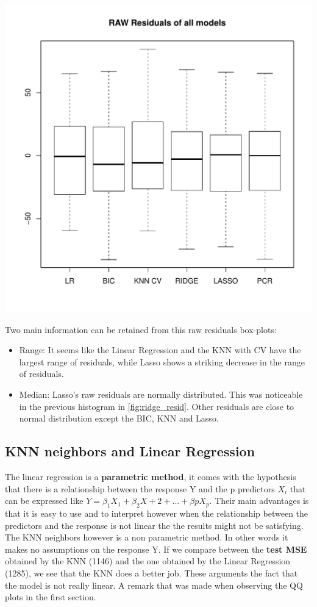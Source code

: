 \documentclass[]{report}
\begin{document}
\begin{center}
	\includegraphics[width=0.8\linewidth]{Figures/all_resid.pdf}
\end{center}
Two main information can be retained from this raw residuals box-plots: 
\begin{itemize}
\item Range: It seems like the Linear Regression and the KNN with CV have the largest range of residuals, while Lasso shows a striking decrease in the range of residuals.
\item Median: Lasso's raw residuals are normally distributed. This was noticeable in the previous histogram in \ref{fig:ridge_resid}. Other residuals are close to normal distribution except the BIC, KNN and Lasso.
\end{itemize}
\subsection{KNN neighbors and Linear Regression}
 The linear regression is a \textbf{parametric method}, it comes with the hypothesis that there is a relationship between the response Y and the p predictors $X_{i}$ that can be expressed like $Y =\beta_{1}X_{1}+\beta_{2}X+{2}+...+\beta{p}X_{p}$. Their main advantages is that it is easy to use and to interpret however when the relationship between the predictors and the response is not linear the the results might not be satisfying. The KNN neighbors however is a non parametric method. In other words it makes no assumptions on the response Y. If we compare between the \textbf{test MSE} obtained by the KNN (1146) and the one obtained by the Linear Regression (1285), we see that the KNN does a better job. These arguments the fact that the model is not really linear. A remark that was made when observing the QQ plots in the first section. 
\end{document}
